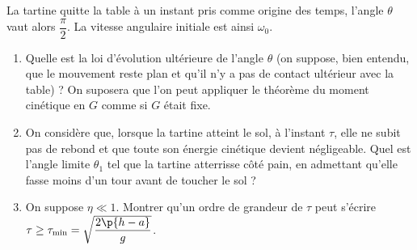 \documentclass[a4paper,french,bookmarks]{article}
\begin{document}
    La tartine quitte la table à un instant pris comme origine des temps, l'angle $\theta$ vaut alors $\dfrac{\pi}{2}$. La vitesse angulaire initiale est ainsi $\omega_0$.
    
    \begin{enumerate}[resume]
        \item Quelle est la loi d'évolution ultérieure de l'angle $\theta$ (on suppose, bien entendu, que le mouvement reste plan et qu'il n'y a pas de contact ultérieur avec la table) ? On suposera que l'on peut appliquer le théorème du moment cinétique en $G$ comme si $G$ était fixe.
        
        \noafter
        \nobefore\yesafter
        \yesbefore
        
        \item On considère que, lorsque la tartine atteint le sol, à l'instant $\tau$, elle ne subit pas de rebond et que toute son énergie cinétique devient négligeable. Quel est l'angle limite $\theta_1$ tel que la tartine atterrisse côté pain, en admettant qu'elle fasse moins d'un tour avant de toucher le sol ?
        
        
        \item On suppose $\eta \ll 1$. Montrer qu'un ordre de grandeur de $\tau$ peut s'écrire $\tau \geq \tau_\text{min} = \sqrt{\dfrac{2\p{h-a}}{g}}$.
        

\end{enumerate}
\end{document}

